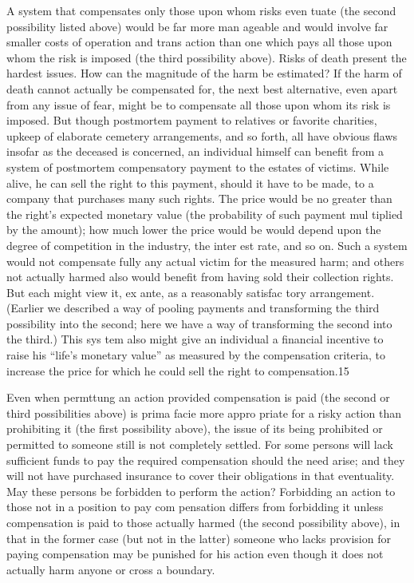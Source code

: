 \documentclass[11pt,openany]{book}
\begin{document}
A system that compensates only those upon whom risks even tuate (the second possibility listed above) would be far more man ageable and would involve far smaller costs of operation and trans action than one which pays all those upon whom the risk is imposed (the third possibility above). Risks of death present the hardest issues. How can the magnitude of the harm be estimated? If the harm of death cannot actually be compensated for, the next best alternative, even apart from any issue of fear, might be to compensate all those upon whom its risk is imposed. But though postmortem payment to relatives or favorite charities, upkeep of elaborate cemetery arrangements, and so forth, all have obvious flaws insofar as the deceased is concerned, an individual himself can benefit from a system of postmortem compensatory payment to the estates of victims. While alive, he can sell the right to this payment, should it have to be made, to a company that purchases many such rights. The price would be no greater than the right's expected monetary value (the probability of such payment mul tiplied by the amount); how much lower the price would be would depend upon the degree of competition in the industry, the inter est rate, and so on. Such a system would not compensate fully any actual victim for the measured harm; and others not actually harmed also would benefit from having sold their collection rights. But each might view it, ex ante, as a reasonably satisfac tory arrangement. (Earlier we described a way of pooling payments and transforming the third possibility into the second; here we have a way of transforming the second into the third.) This sys tem also might give an individual a financial incentive to raise his ``life's monetary value'' as measured by the compensation criteria, to increase the price for which he could sell the right to compensation.15 

Even when permttung an action provided compensation is paid (the second or third possibilities above) is prima facie more appro priate for a risky action than prohibiting it (the first possibility above), the issue of its being prohibited or permitted to someone still is not completely settled. For some persons will lack sufficient funds to pay the required compensation should the need arise; and they will not have purchased insurance to cover their obligations in that eventuality. May these persons be forbidden to perform the action? Forbidding an action to those not in a position to pay com pensation differs from forbidding it unless compensation is paid to those actually harmed (the second possibility above), in that in the former case (but not in the latter) someone who lacks provision for paying compensation may be punished for his action even though it does not actually harm anyone or cross a boundary. 
\end{document}
